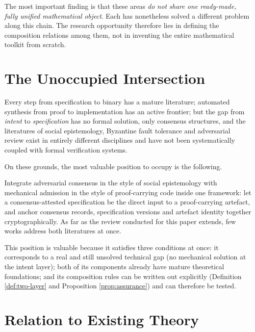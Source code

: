 The most important finding is that these areas \emph{do not share one ready-made, fully
unified mathematical object}. Each has nonetheless solved a different problem along this
chain. The research opportunity therefore lies in defining the composition relations among
them, not in inventing the entire mathematical toolkit from scratch.

\section{The Unoccupied Intersection}\label{sec:gaps}

\begin{principle}\label{pr:map-shape}
Every step from specification to binary has a mature literature; automated synthesis from
proof to implementation has an active frontier; but the gap from \emph{intent} to
\emph{specification} has no formal solution, only consensus structures, and the literatures
of social epistemology, Byzantine fault tolerance and adversarial review exist in entirely
different disciplines and have not been systematically coupled with formal verification
systems.
\end{principle}

On these grounds, the most valuable position to occupy is the following.

\begin{principle}\label{pr:position}
Integrate adversarial consensus in the style of social epistemology with mechanical
admission in the style of proof-carrying code inside one framework: let a
consensus-attested specification be the direct input to a proof-carrying artefact, and
anchor consensus records, specification versions and artefact identity together
cryptographically. As far as the review conducted for this paper extends, few works address
both literatures at once.
\end{principle}

This position is valuable because it satisfies three conditions at once: it corresponds to a
real and still unsolved technical gap (no mechanical solution at the intent layer); both of
its components already have mature theoretical foundations; and its composition rules can
be written out explicitly (Definition \ref{def:two-layer} and Proposition \ref{prop:assurance})
and can therefore be tested.

\section{Relation to Existing Theory}\label{sec:relations-lit}

